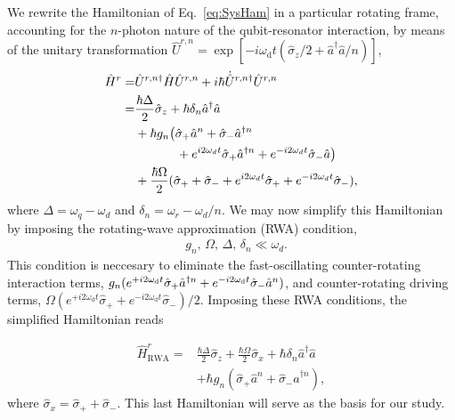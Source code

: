 We rewrite the Hamiltonian of Eq.~\eqref{eq:SysHam} in a particular rotating frame, accounting for the $n$-photon nature of the qubit-resonator interaction, by means of the unitary transformation $\hat{U}^{r,n}=\exp[-i\omega_{\text{d}}t(\hat{\sigma}_z/2 + \hat{a}^\dagger \hat{a}/n)]$,
\begin{align}\label{eq:FullRotFrameHam}
    \hat{H}^r =& \hat{U}^{r,n \dagger} \hat{H}\hat{U}^{r,n}+i\hbar \dot{\hat{U}}^{r,n \dagger}\hat{U}^{r,n}\nonumber\\ =&\frac{\hbar \Delta}{2}\hat{\sigma}_z + \hbar \delta_n\hat{a}^\dagger \hat{a} \nonumber\\&+ \hbar g_n\big(\hat{\sigma}_+\hat{a}^n + \hat{\sigma}_-\hat{a}^{\dagger n}\nonumber\\ &\,\,\,\,\,\,\,\,\,\,\,\,\,\,\,\,\,\,\,\,+ e^{i2\omega_d t}\hat{\sigma}_+\hat{a}^{\dagger n} + e^{-i2\omega_d t} \hat{\sigma}_-\hat{a}\big)\nonumber\\& +\frac{\hbar\Omega}{2}(\hat{\sigma}_+ +\hat{\sigma}_- +e^{i2\omega_d t}\hat{\sigma}_+ + e^{-i2\omega_d t}\hat{\sigma}_-), 
\end{align}
where $\Delta=\omega_q -\omega_d$ and $\delta_n=\omega_r - \omega_d/n$. We may now simplify this Hamiltonian by imposing the rotating-wave approximation (RWA) condition,
    \begin{align}
        &\label{eq:RWA2}g_n, \,\Omega,\, \Delta,\,\delta_n \ll \omega_d.
    \end{align}
This condition is neccesary to eliminate the fast-oscillating counter-rotating interaction terms, $g_n(e^{+i2\omega_{\text{d}}t}\hat{\sigma}_+\hat{a}^{\dagger n} +e^{-i2\omega_{\text{d}}t}\hat{\sigma}_-\hat{a}^n)$, and counter-rotating driving terms, $\Omega(e^{+i2\omega_{\text{d}}t}\hat{\sigma}_+ +e^{-i2\omega_{\text{d}}t}\hat{\sigma}_-)/2$. Imposing these RWA conditions, the simplified Hamiltonian reads

\begin{align}\label{eq:SimplifiedRotFrameHam}
    \hat{H}^r_{\text{RWA}} =&\frac{\hbar \Delta}{2}\hat{\sigma}_z +\frac{\hbar \Omega}{2}\hat{\sigma}_x + \hbar \delta_n\hat{a}^\dagger \hat{a} \nonumber\\&+ \hbar g_n(\hat{\sigma}_+\hat{a}^n +\hat{\sigma}_-\hat{a}^{\dagger n}), 
\end{align}
where $\hat{\sigma}_x=\hat{\sigma}_++\hat{\sigma}_-$. This last Hamiltonian will serve as the basis for our study.


